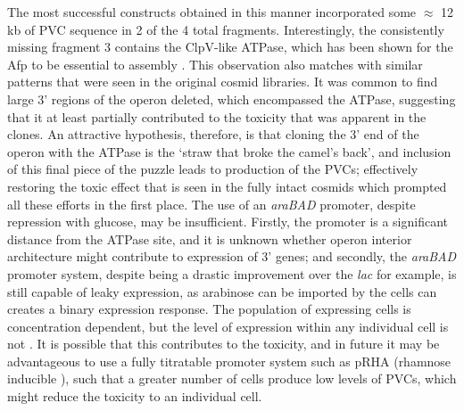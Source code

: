 The most successful constructs obtained in this manner incorporated some $\approx$ 12 kb of PVC sequence in 2 of the 4 total fragments. Interestingly, the consistently missing fragment 3 contains the ClpV-like ATPase, which has been shown for the Afp to be essential to assembly \citep{Rybakova2015}. This observation also matches with similar patterns that were seen in the original cosmid libraries. It was common to find large 3' regions of the operon deleted, which encompassed the ATPase, suggesting that it at least partially contributed to the toxicity that was apparent in the clones. An attractive hypothesis, therefore, is that cloning the 3' end of the operon with the ATPase is the `straw that broke the camel's back', and inclusion of this final piece of the puzzle leads to production of the PVCs; effectively restoring the toxic effect that is seen in the fully intact cosmids which prompted all these efforts in the first place. The use of an \emph{araBAD} promoter, despite repression with glucose, may be insufficient. Firstly, the promoter is a significant distance from the ATPase site, and it is unknown whether operon interior architecture might contribute to expression of 3' genes; and secondly, the \emph{araBAD} promoter system, despite being a drastic improvement over the \emph{lac} for example, is still capable of leaky expression, as arabinose can be imported by the cells can creates a binary expression response. The population of expressing cells is concentration dependent, but the level of expression within any individual cell is not \citep{Siegele1997, Khlebnikov2000}. It is possible that this contributes to the toxicity, and in future it may be advantageous to use a fully titratable promoter system such as pRHA (rhamnose inducible \citep{Giacalone2006}), such that a greater number of cells produce low levels of PVCs, which might reduce the toxicity to an individual cell. 

